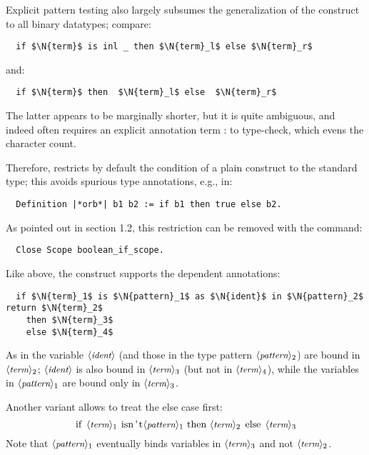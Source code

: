 Explicit pattern testing also largely subsumes the generalization of
the  construct to all binary datatypes; compare:
\begin{lstlisting}
  if $\N{term}$ is inl _ then $\N{term}_l$ else $\N{term}_r$
\end{lstlisting}
and:
\begin{lstlisting}
  if $\N{term}$ then  $\N{term}_l$ else  $\N{term}_r$
\end{lstlisting}
The latter appears to be marginally shorter, but it is quite
ambiguous, and indeed often
requires an explicit annotation term : \C{{_}+{_}} to type-check,
which evens the character count.

Therefore, \ssr{} restricts by default the condition of a plain 
construct to the standard  type; this avoids spurious type
annotations, e.g., in:
\begin{lstlisting}
  Definition |*orb*| b1 b2 := if b1 then true else b2.
\end{lstlisting}
As pointed out in section 1.2, this restriction can be removed with
the command:
\begin{lstlisting}
  Close Scope boolean_if_scope.
\end{lstlisting}
Like  above, the  construct
supports the dependent  annotations:
\begin{lstlisting}
  if $\N{term}_1$ is $\N{pattern}_1$ as $\N{ident}$ in $\N{pattern}_2$ return $\N{term}_2$
    then $\N{term}_3$
    else $\N{term}_4$
\end{lstlisting}
As in  the variable $\langle\mbox{\itshape\rmfamily\small ident}\rangle$ (and those in
the type pattern $\langle\mbox{\itshape\rmfamily\small pattern}\rangle_2$) are bound in $\langle\mbox{\itshape\rmfamily\small term}\rangle_2$; $\langle\mbox{\itshape\rmfamily\small ident}\rangle$ is
also bound in $\langle\mbox{\itshape\rmfamily\small term}\rangle_3$ (but not in $\langle\mbox{\itshape\rmfamily\small term}\rangle_4$), while the
variables in $\langle\mbox{\itshape\rmfamily\small pattern}\rangle_1$ are bound only in $\langle\mbox{\itshape\rmfamily\small term}\rangle_3$.

\noindent
Another variant allows to treat the else case first:
\[\C{if}\ \N{term}_1\ \C{isn't }\N{pattern}_1\ \C{then}\ \N{term}_2\ \C{else}
\ \N{term}_3\]
Note that $\langle\mbox{\itshape\rmfamily\small pattern}\rangle_1$ eventually binds variables in $\langle\mbox{\itshape\rmfamily\small term}\rangle_3$
and not $\langle\mbox{\itshape\rmfamily\small term}\rangle_2$.

